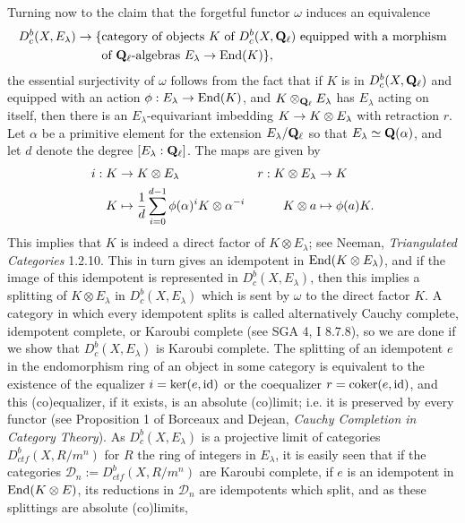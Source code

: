 \documentclass[deligne.tex]{subfiles}
\begin{document}
Turning now to the claim that the forgetful functor $\omega$ induces an
equivalence
\begin{align*}
	D_c^b(X,E_\lambda)\rightarrow
	\{&\text{category of objects $K$ of $D_c^b(X,\mathbf{Q}_\ell)$ equipped with
	a morphism} \\
	&\text{of $\mathbf{Q}_\ell$-algebras $E_\lambda\rightarrow\operatorname{End}(K)$}\},
\end{align*}
the essential surjectivity of $\omega$ follows from the fact that if $K$ is 
in $D_c^b(X,\mathbf{Q}_\ell)$ and equipped with an action $\phi:E_\lambda\rightarrow\operatorname{End}(K)$, 
and $K\otimes_{\mathbf{Q}_\ell}E_\lambda$ has $E_\lambda$ acting on itself, then
there is an $E_\lambda$-equivariant imbedding $K\rightarrow K\otimes E_\lambda$ with 
retraction $r$. Let $\alpha$ be a primitive element for the extension
$E_\lambda/\mathbf{Q}_\ell$ so that $E_\lambda\simeq\mathbf{Q}(\alpha)$, and let
$d$ denote the degree $[E_\lambda:\mathbf{Q}_\ell]$. The maps are given by
\begin{align*}
	i:K&\rightarrow K\otimes E_\lambda &
	r:K\otimes E_\lambda &\rightarrow K \\
	K&\mapsto \frac1d\sum_{i=0}^{d-1}\phi(\alpha)^iK\otimes\alpha^{-i} &
	K\otimes a&\mapsto\phi(a)K.
\end{align*}
This implies that $K$ is indeed a direct factor of $K\otimes E_\lambda$;
see Neeman, \emph{Triangulated Categories} 1.2.10. This in turn gives an
idempotent in $\operatorname{End}(K\otimes E_\lambda)$, and if the image of this 
idempotent is represented in $D_c^b(X,E_\lambda)$, then this implies a
splitting of $K\otimes E_\lambda$ in $D_c^b(X,E_\lambda)$ which is sent by
$\omega$ to the direct factor $K$.
A category in which every idempotent splits is called alternatively
Cauchy complete, idempotent complete, or Karoubi complete
(see SGA 4, I 8.7.8), so we are done if
we show that $D_c^b(X,E_\lambda)$ is Karoubi complete.
The splitting of an idempotent $e$ in the endomorphism ring of an object
in some category is equivalent to the existence of the equalizer
$i=\ker(e,\operatorname{id})$ or the coequalizer $r=\operatorname{coker}(e,\operatorname{id})$, and this 
(co)equalizer, if it exists, is an absolute (co)limit; i.e. it is preserved
by every functor (see Proposition 1 of Borceaux and Dejean,
\emph{Cauchy Completion in Category Theory}). As $D_c^b(X,E_\lambda)$
is a projective limit of categories $D_{ctf}^b(X,R/m^n)$ for $R$ the ring
of integers in $E_\lambda$, it is easily seen that if the categories
$\mathcal D_n:=D_{ctf}^b(X,R/m^n)$ are Karoubi complete, if $e$ is an 
idempotent in $\operatorname{End}(K\otimes E)$, its reductions in $\mathcal D_n$ are
idempotents which split, and as these splittings are absolute (co)limits,
\end{document}
